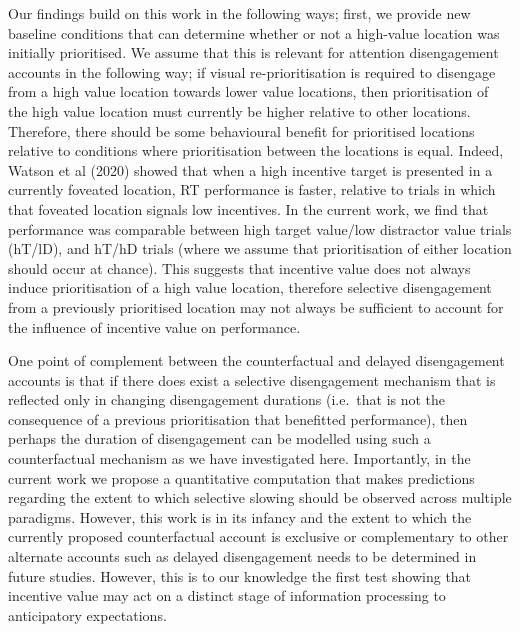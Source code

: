 \documentclass[11pt,halfline,a4paper,]{ouparticle}
\begin{document}
Our findings build on this work in the following ways; first, we provide new baseline conditions that can determine whether or not a high-value location was initially prioritised. We assume that this is relevant for attention disengagement accounts in the following way; if visual re-prioritisation is required to disengage from a high value location towards lower value locations, then prioritisation of the high value location must currently be higher relative to other locations. Therefore, there should be some behavioural benefit for prioritised locations relative to conditions where prioritisation between the locations is equal. Indeed, Watson et al (2020) showed that when a high incentive target is presented in a currently foveated location, RT performance is faster, relative to trials in which that foveated location signals low incentives. In the current work, we find that performance was comparable between high target value/low distractor value trials (hT/lD), and hT/hD trials (where we assume that prioritisation of either location should occur at chance). This suggests that incentive value does not always induce prioritisation of a high value location, therefore selective disengagement from a previously prioritised location may not always be sufficient to account for the influence of incentive value on performance.

One point of complement between the counterfactual and delayed disengagement accounts is that if there does exist a selective disengagement mechanism that is reflected only in changing disengagement durations (i.e.~that is not the consequence of a previous prioritisation that benefitted performance), then perhaps the duration of disengagement can be modelled using such a counterfactual mechanism as we have investigated here. Importantly, in the current work we propose a quantitative computation that makes predictions regarding the extent to which selective slowing should be observed across multiple paradigms. However, this work is in its infancy and the extent to which the currently proposed counterfactual account is exclusive or complementary to other alternate accounts such as delayed disengagement needs to be determined in future studies. However, this is to our knowledge the first test showing that incentive value may act on a distinct stage of information processing to anticipatory expectations.
\end{document}
